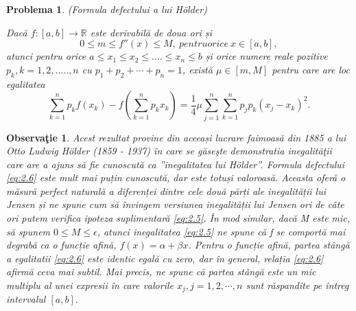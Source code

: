 \documentclass[a4paper,12pt,oneside]{report}
\newtheorem{problem}{Problema}
\newtheorem{remark}{Observa\c{t}ie}
\begin{document}
\begin{problem}
(Formula defectului a lui Hölder)

Dacă \(f : \left [ a,b  \right ] \to \mathbb{R}\) este derivabilă de doua ori și
\begin{displaymath}
  0 \leq m \leq  f''\left ( x \right ) \leq  M,~ pentru orice ~x\in \left [ a,b \right ], \label{eq:2.5} \tag{2.5}
\end{displaymath}
atunci pentru orice  \(a\leq x_{1}\leq x_{2}\leq ....\leq x_{n} \leq b \) și orice numere reale pozitive \(p_{k}, k= 1,2,.....,n \) cu \(p_{1} + p_{2} + \cdots+ p_{n} = 1\),  există  \(\mu \in \left [ m, M \right ]\) pentru care are loc egalitatea
\begin{displaymath}
  \sum_{k = 1}^{n}p_{k}f\left ( x_{k} \right ) - f\left ( \sum_{k = 1}^{n} p_{k}x_{k}\right ) = \frac{1}{4}\mu \sum_{j = 1}^{n}\sum_{k = 1}^{n}p_{j}p_{k}\left ( x_{j} - x_{k} \right )^{2}. \label{eq:2.6} \tag{2.6}
\end{displaymath}
\end{problem}
\begin{remark}
Acest rezultat provine din aceeași lucrare faimoasă din 1885 a lui Otto Ludwig Hölder (1859 - 1937) în care se găseşte demonstratia inegalităţii care are a ajuns să fie cunoscută  ca ”inegalitatea lui Hölder”. Formula defectului \ref{eq:2.6} este mult mai puțin cunoscută, dar este totuși valoroasă. Aceasta oferă o măsură perfect naturală a diferenței dintre cele două părți ale inegalității lui Jensen și ne spune cum să învingem versiunea  inegalității lui Jensen ori de câte ori putem verifica ipoteza suplimentară \ref{eq:2.5}.
În mod similar, dacă M este mic, să spunem \(0 \leq M \leq \epsilon\), atunci inegalitatea \ref{eq:2.5} ne spune că f se comportă mai degrabă ca o funcție afină, \(f\left ( x \right ) = \alpha  + \beta x\). Pentru o funcție afină, partea stângă a egalitatii \ref{eq:2.6} este identic egală cu zero, dar în general, relația \ref{eq:2.6} afirmă ceva mai subtil. Mai precis, ne spune că partea stângă este un mic multiplu al unei expresii  în care valorile \(x_{j}, j = 1,2,\cdots ,n \) sunt răspandite pe întreg intervalul \(\left [ a, b \right ]. \)
\end{remark}
\end{document}
